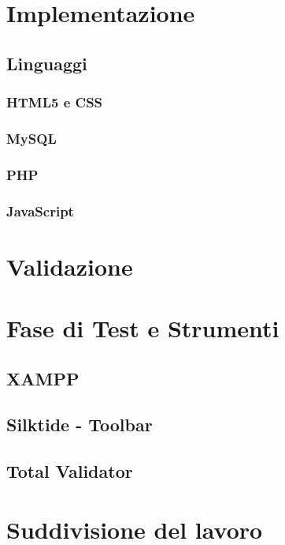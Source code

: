 \documentclass[a4paper, dvipsnames, table]{article}
\begin{document}
\newpage
\section{Implementazione}%
	\subsection{Linguaggi}
		\subsubsection{HTML5 e CSS}
			
		\subsubsection{MySQL}
			
		\subsubsection{PHP}
			
		\subsubsection{JavaScript}
			

\newpage
\section{Validazione}%
	

\newpage
\section{Fase di Test e Strumenti}%
	\subsection{XAMPP}
		
	\subsection{Silktide - Toolbar}
		
	\subsection{Total Validator}
		
	
\newpage
\section{Suddivisione del lavoro}
	
\end{document}
